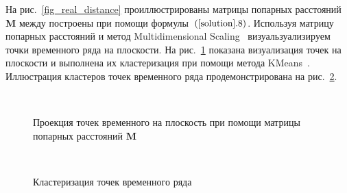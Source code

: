 \documentclass[12pt, twoside]{article}
\begin{document}
На рис.~\ref{fig_real_distance} проиллюстрированы матрицы попарных расстояний $\textbf{M}$ между построены при помощи формулы~$(\ref{solution}.8)$. Используя матрицу попарных расстояний и метод Multidimensional Scaling~\cite{Borg2005} визуальзуализируем точки временного ряда на плоскости. На рис.~\ref{fig_real_2D} показана визуализация точек на плоскости и выполнена их кластеризация при помощи метода KMeans~\cite{Kanungo2000}. Иллюстрация кластеров точек временного ряда продемонстрирована на рис.~\ref{fig_real_claster}.


\begin{figure}[h!t]\center
{}
\\
\caption{Проекция точек временного на плоскость при помощи матрицы попарных расстояний $\textbf{M}$}
\label{fig_real_2D}
\end{figure}

\begin{figure}[h!t]\center
{}
\\
\caption{Кластеризация точек временного ряда}
\label{fig_real_claster}
\end{figure}
\end{document}
